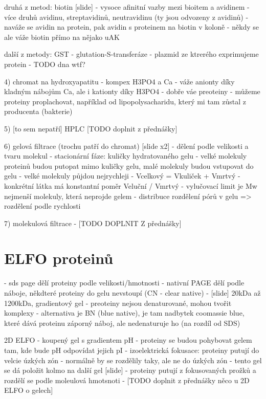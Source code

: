 \documentclass[DIV=8]{scrreprt}
\begin{document}
druhá z metod: biotin [slide]
- vysoce afinitní vazby mezi bioitem a avidinem
- více druhů avidinu, streptavidinů, neutravidinu (ty jsou odvozeny z avidinů)
- naváže se avidin na protein, pak avidin s proteinem na biotin v koloně
    - někdy se ale váže biotin přímo na nějako uAK

další z metody: GST
- glutation-S-transferáze
- plazmid ze ktrerého exprimujeme protein
- TODO dna wtf?

4) chromat na hydroxyapatitu
- kompex H3PO4 a Ca
- váže anionty díky kladným nábojům Ca, ale i kationty díky H3PO4
- dobře váe preoteiny
    - můžeme proteiny proplachovat, například od lipopolysacharidu, který mi tam zůstal z producenta (bakterie)

5) [to sem nepatří] HPLC
[TODO doplnit z přednášky]

6) gelová filtrace (trochu patří do chromat) [slide x2]
- dělení podle velikosti a tvaru molekul
- stacionární fáze: kuličky hydratovaného gelu
- velké molekuly proteinů budou putopat mimo kuličky gelu, malé molekuly budou vstupovat do gelu
- velké molekuly půjdou nejrychleji
    - Vcelkový = Vkuliček + Vmrtvý
    - konkrétní látka má konstantní poměr Veluční / Vmrtvý
    - vylučovací limit je Mw nejmenší molekuly, která neprojde gelem
- distribuce rozdělení pórů v gelu => rozdělení podle rychlosti

7) molekulová filtrace
- [TODO DOPLNIT Z přednášky]

\section{ELFO proteinů} \label{ELFO proteinů} \FloatBarrier

- sds page dělí proteiny podle velikosti/hmotnosti
- nativní PAGE dělí podle náboje, někdteré proteiny do gelu nevstoupí (CN - clear native)
- [slide] 20kDa až 1200kDa, gradientový gel
- preoteiny nejsou denaturované, mohou tvořit komplexy
- alternativa je BN (blue native), je tam nadbytek coomassie blue, které dává proteinu záporný náboj, ale nedenaturuje ho (na rozdíl od SDS)

2D ELFO
- koupený gel s gradientem pH
- proteiny se budou pohybovat gelem tam, kde bude pH odpovídat jejich pI
    - izoelektrická fokusace: proteiny putují do velcie úzkých zón
    - normálně by se rozdělily taky, ale ne do úzkých zón
- tento gel se dá položit kolmo na další gel [slide]
    - proteiny putují z fokusovaných prožků a rozdělí se podle moleulová hmotsnoti
- [TODO doplnit z přednášky něco u 2D ELFO o gelech]
\end{document}

